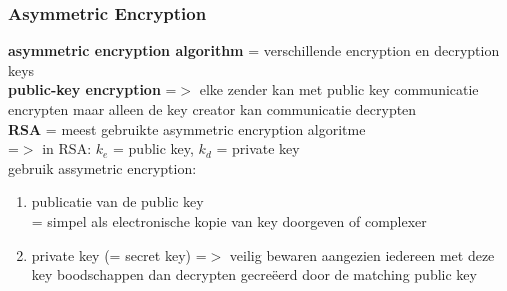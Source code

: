 \documentclass{report}
\begin{document}
\subsubsection{Asymmetric Encryption}
\textbf{asymmetric encryption algorithm} = verschillende encryption en decryption keys
\\\textbf{public-key encryption} =$>$ elke zender kan met public key communicatie encrypten maar alleen de key creator kan communicatie decrypten
\\\textbf{RSA} = meest gebruikte asymmetric encryption algoritme
\\=$>$ in RSA: $k_{e}$ = public key, $k_{d}$ = private key
\\gebruik assymetric encryption:
\begin{enumerate}
\item publicatie van de public key
\\= simpel als electronische kopie van key doorgeven of complexer
\item private key (= secret key) =$>$ veilig bewaren aangezien iedereen met deze key boodschappen dan decrypten gecre\"eerd door de matching public key 
\end{enumerate}
\end{document}
